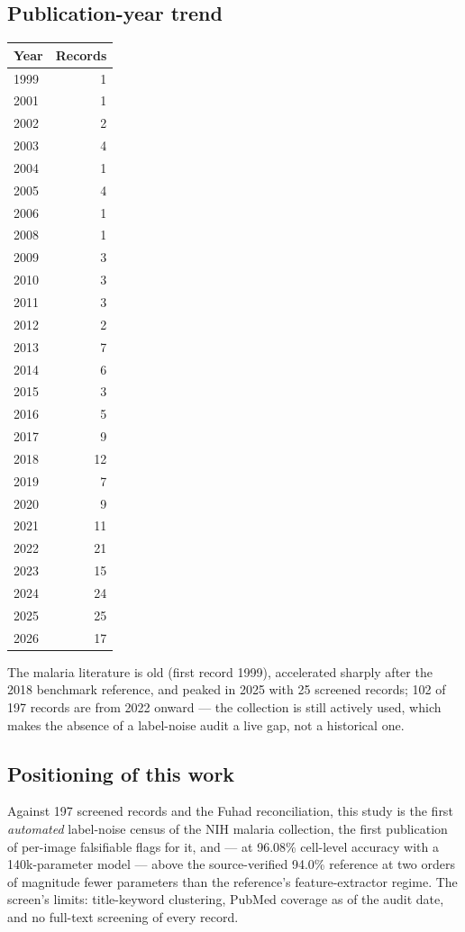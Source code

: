 \subsection*{Publication-year trend}
\begin{tabular}{lr}
\hline
Year & Records \\
\hline
1999 & 1 \\
2001 & 1 \\
2002 & 2 \\
2003 & 4 \\
2004 & 1 \\
2005 & 4 \\
2006 & 1 \\
2008 & 1 \\
2009 & 3 \\
2010 & 3 \\
2011 & 3 \\
2012 & 2 \\
2013 & 7 \\
2014 & 6 \\
2015 & 3 \\
2016 & 5 \\
2017 & 9 \\
2018 & 12 \\
2019 & 7 \\
2020 & 9 \\
2021 & 11 \\
2022 & 21 \\
2023 & 15 \\
2024 & 24 \\
2025 & 25 \\
2026 & 17 \\
\hline
\end{tabular}

The malaria literature is old (first record 1999), accelerated sharply after the 2018 benchmark reference, and peaked in 2025 with 25 screened records; 102 of 197 records are from 2022 onward --- the collection is still actively used, which makes the absence of a label-noise audit a live gap, not a historical one.\par

\subsection*{Positioning of this work}
Against 197 screened records and the Fuhad reconciliation, this study is the first \emph{automated} label-noise census of the NIH malaria collection, the first publication of per-image falsifiable flags for it, and --- at 96.08\% cell-level accuracy with a 140k-parameter model --- above the source-verified 94.0\% reference at two orders of magnitude fewer parameters than the reference's feature-extractor regime. The screen's limits: title-keyword clustering, PubMed coverage as of the audit date, and no full-text screening of every record.


